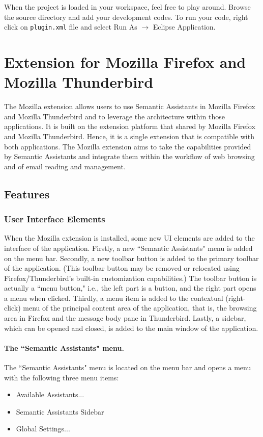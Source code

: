 When the project is loaded in your workspace, feel free to play around. Browse
the source directory and add your development codes. To run your code, right
click on \texttt{plugin.xml} file and select Run As $\rightarrow$ Eclipse
Application.


\section{Extension for Mozilla Firefox and Mozilla Thunderbird} 

The Mozilla extension allows users to use Semantic Assistants in Mozilla Firefox and Mozilla Thunderbird and to leverage the \sa architecture within those applications. It is built on the extension platform that shared by Mozilla Firefox and Mozilla Thunderbird. Hence, it is a single extension that is compatible with both applications. The Mozilla extension aims to take the capabilities provided by Semantic Assistants and integrate them within the workflow of web browsing and of email reading and management. 

\subsection{Features}
\label{subsec:mozilla_features}

\subsubsection{User Interface Elements}
When the \sa Mozilla extension is installed, some new UI elements are added to the interface of the application. Firstly, a new ``Semantic Assistants" menu is added on the menu bar. Secondly, a new toolbar button is added to the primary toolbar of the application. (This toolbar button may be removed or relocated using Firefox/Thunderbird's built-in customization capabilities.) The toolbar button is actually a ``menu button," i.e., the left part is a button, and the right part opens a menu when clicked. Thirdly, a menu item is added to the contextual (right-click) menu of the principal content area of the application, that is, the browsing area in Firefox and the message body pane in Thunderbird. Lastly, a sidebar, which can be opened and closed, is added to the main window of the application. 

\paragraph{The ``Semantic Assistants" menu.} The ``Semantic Assistants" menu is 
located on the menu bar and opens a menu with the following three menu items: 
\begin{itemize} 
  \item Available Assistants... 
  \item Semantic Assistants Sidebar 
  \item Global Settings... 
\end{itemize} 

